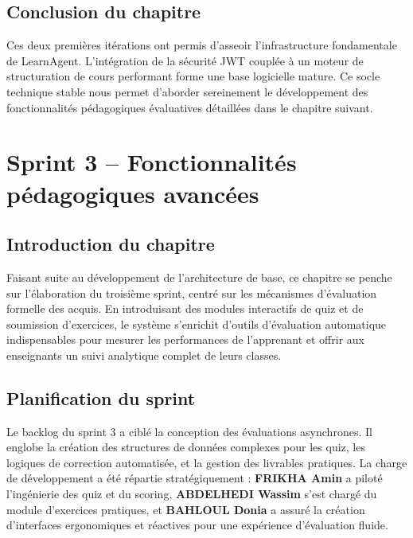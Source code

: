 \documentclass[12pt,a4paper]{report}
\begin{document}
\section*{Conclusion du chapitre}
Ces deux premières itérations ont permis d'asseoir l'infrastructure fondamentale de LearnAgent. L'intégration de la sécurité JWT couplée à un moteur de structuration de cours performant forme une base logicielle mature. Ce socle technique stable nous permet d'aborder sereinement le développement des fonctionnalités pédagogiques évaluatives détaillées dans le chapitre suivant.

\newpage

\chapter{Sprint 3 -- Fonctionnalités pédagogiques avancées}

\section*{Introduction du chapitre}
Faisant suite au développement de l'architecture de base, ce chapitre se penche sur l'élaboration du troisième sprint, centré sur les mécanismes d'évaluation formelle des acquis. En introduisant des modules interactifs de quiz et de soumission d'exercices, le système s'enrichit d'outils d'évaluation automatique indispensables pour mesurer les performances de l'apprenant et offrir aux enseignants un suivi analytique complet de leurs classes.

\section{Planification du sprint}

Le backlog du sprint 3 a ciblé la conception des évaluations asynchrones. Il englobe la création des structures de données complexes pour les quiz, les logiques de correction automatisée, et la gestion des livrables pratiques. La charge de développement a été répartie stratégiquement : \textbf{FRIKHA Amin} a piloté l'ingénierie des quiz et du scoring, \textbf{ABDELHEDI Wassim} s'est chargé du module d'exercices pratiques, et \textbf{BAHLOUL Donia} a assuré la création d'interfaces ergonomiques et réactives pour une expérience d'évaluation fluide.
\end{document}
